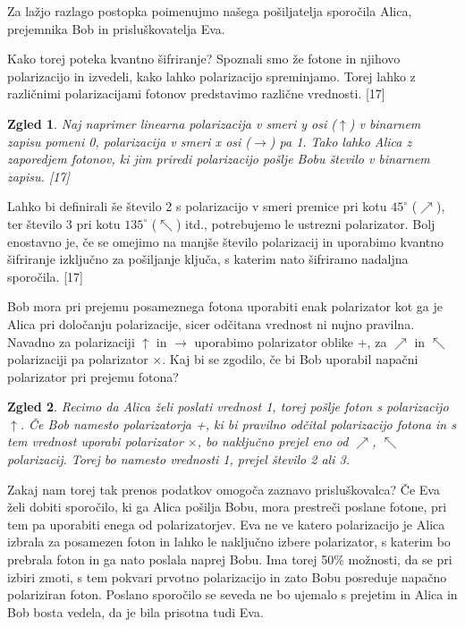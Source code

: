 \documentclass[A4paper, 11pt]{article}
\newtheorem{zgled}{Zgled}
\begin{document}
Za lažjo razlago postopka poimenujmo našega pošiljatelja sporočila Alica, prejemnika Bob in prisluškovatelja Eva.

Kako torej poteka kvantno šifriranje?
Spoznali smo že fotone in njihovo polarizacijo in izvedeli, kako lahko polarizacijo spreminjamo. Torej lahko z različnimi polarizacijami fotonov predstavimo različne vrednosti. [17]

\begin{zgled}
Naj naprimer linearna polarizacija v smeri y osi ($\uparrow$) v binarnem zapisu pomeni 0, polarizacija v smeri x osi ($\rightarrow$) pa 1. Tako lahko Alica z zaporedjem fotonov, ki jim priredi polarizacijo pošlje Bobu število v binarnem zapisu. [17]
\end{zgled}

Lahko bi definirali še število 2 s polarizacijo v smeri premice pri kotu $45^{\circ}$ ($\nearrow$), ter število 3 pri kotu $135^{\circ}$ ($\nwarrow$) itd., potrebujemo le ustrezni polarizator. Bolj enostavno je, če se omejimo na manjše število polarizacij in uporabimo kvantno šifriranje izključno za pošiljanje ključa, s katerim nato šifriramo nadaljna sporočila. [17]

Bob mora pri prejemu posameznega fotona uporabiti enak polarizator kot ga je Alica pri določanju polarizacije, sicer odčitana vrednost ni nujno pravilna. Navadno za polarizaciji $\uparrow$ in $\rightarrow$ uporabimo polarizator oblike +, za $\nearrow$ in $\nwarrow$ polarizaciji pa polarizator $\times$. Kaj bi se zgodilo, če bi Bob uporabil napačni polarizator pri prejemu fotona? 

\begin{zgled}
Recimo da Alica želi poslati vrednost 1, torej pošlje foton s polarizacijo $\uparrow$. Če Bob namesto polarizatorja +, ki bi pravilno odčital polarizacijo fotona in s tem vrednost uporabi polarizator $\times$, bo naključno prejel eno od $\nearrow$, $\nwarrow$ polarizacij. Torej bo namesto vrednosti 1, prejel število 2 ali 3.
\end{zgled}

Zakaj nam torej tak prenos podatkov omogoča zaznavo prisluškovalca?
Če Eva želi dobiti sporočilo, ki ga Alica pošilja Bobu, mora prestreči poslane fotone, pri tem pa uporabiti enega od polarizatorjev. Eva ne ve katero polarizacijo je Alica izbrala za posamezen foton in lahko le naključno izbere polarizator, s katerim bo prebrala foton in ga nato poslala naprej Bobu. Ima torej 50\% možnosti, da se pri izbiri zmoti, s tem pokvari prvotno polarizacijo in zato Bobu posreduje napačno polariziran foton. Poslano sporočilo se seveda ne bo ujemalo s prejetim in Alica in Bob bosta vedela, da je bila prisotna tudi Eva. 
\end{document}
